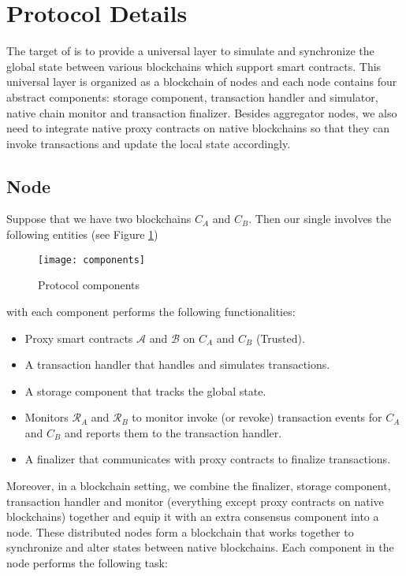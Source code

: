 \section{Protocol Details}
\label{chp:protocol-details}
The target of \dprotocol is to provide a universal layer to simulate and synchronize the global state between various blockchains which support smart contracts. This universal layer is organized as a blockchain of \dprotocol nodes and each node contains four abstract components: storage component, transaction handler and simulator, native chain monitor and transaction finalizer.  Besides aggregator nodes, we also need to 
integrate native proxy contracts on native blockchains so that they can invoke transactions and update the local state accordingly.


\subsection{\dprotocol Node}
Suppose that we have two blockchains $C_{A}$ and $C_{B}$. Then our single \dprotocol involves the following entities (see Figure \ref{protocol-components})
\begin{figure}[!ht]
\centerline{\texttt{[image: components]}}
\caption{Protocol components}
\label{protocol-components}
\end{figure}

\noindent with each component performs the following functionalities:
\begin{itemize}
\item  Proxy smart contracts $\mathcal{A}$ and $\mathcal{B}$ on $C_A$ and $C_B$ (Trusted).
\item  A transaction handler that handles and simulates transactions.
\item  A storage component that tracks the global state.
\item  Monitors $\mathcal{R}_A$ and $\mathcal{R}_B$ to monitor invoke (or revoke) transaction events for $C_A$ and $C_B$ and reports them to the transaction handler.
\item  A finalizer that communicates with proxy contracts to finalize transactions.
\end{itemize}
\smallskip
Moreover, in a blockchain setting, we combine the finalizer, storage component, transaction handler and monitor (everything except proxy contracts on native blockchains) together and equip it with an extra consensus component into a \dprotocol node. These distributed \dprotocol nodes form a blockchain that works together to synchronize and alter states between native blockchains. Each component in the node performs the following task:

